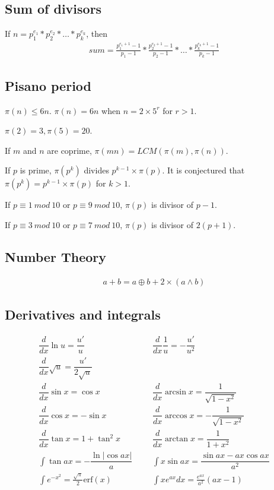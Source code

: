 \documentclass[a4paper, 12pt, oneside, landscape]{article}
\begin{document}
\begin{multicols}{2}
    \subsection{Sum of divisors}
    If $n = p^{e_1}_1 * p^{e_2}_2 * \dots * p^{e_k}_k$, then
    \begin{align*}
        sum = \frac{p^{e_1 + 1}_1 - 1}{p_1 - 1} * \frac{p^{e_2 + 1}_2 - 1}{p_2 - 1} * \dots * \frac{p^{e_k + 1}_k - 1}{p_k - 1}
    \end{align*}
    
    \subsection{Pisano period}
    $\pi(n) \leq 6n.$ $\pi(n) = 6n$ when $n = 2 \times 5^r$ for $r > 1$. \par 
    $\pi(2) = 3, \pi(5) = 20$. \par 
    If $m$ and $n$ are coprime, $\pi(mn) = LCM(\pi(m), \pi(n))$. \par
    If $p$ is prime, $\pi(p^k)$ divides $p^{k - 1} \times \pi(p)$. It is conjectured that $\pi(p^k) = p^{k - 1} \times \pi(p)$ for $k > 1$. \par
    If $p \equiv 1 \ mod \ 10$ or $p \equiv 9 \ mod \ 10$, $\pi(p)$ is divisor of $p - 1$. \par 
    If $p \equiv 3 \ mod \ 10$ or $p \equiv 7 \ mod \ 10$, $\pi(p)$ is divisor of $2(p + 1)$.
    
    \subsection{Number Theory}
    \begin{align*}
        a + b = a \oplus b + 2 \times (a \wedge b)
    \end{align*}
    
	\subsection{Derivatives and integrals}
	\begin{align*}
        \dfrac{d}{dx}\ln{u} = \dfrac{u'}{u} &&& \dfrac{d}{dx}\dfrac{1}{u} = -\dfrac{u'}{u^2} \\
    	\dfrac{d}{dx}\sqrt u = \dfrac{u'}{2\sqrt u} \\
    	\dfrac{d}{dx}\sin x = \cos x &&& \dfrac{d}{dx}\arcsin x = \dfrac{1}{\sqrt{1-x^2}} \\ 
    	\dfrac{d}{dx}\cos x = -\sin x &&& \dfrac{d}{dx}\arccos x = -\dfrac{1}{\sqrt{1-x^2}} \\
    	\dfrac{d}{dx}\tan x = 1+\tan^2 x &&& \dfrac{d}{dx}\arctan x = \dfrac{1}{1+x^2} \\
    	\int\tan ax = -\dfrac{\ln|\cos ax|}{a} &&& \int x\sin ax = \dfrac{\sin ax-ax \cos ax}{a^2} \\
    	\int e^{-x^2} = \frac{\sqrt \pi}{2} \text{erf}(x) &&& \int xe^{ax}dx = \frac{e^{ax}}{a^2}(ax-1)
	\end{align*}


\end{multicols}
\end{document}
